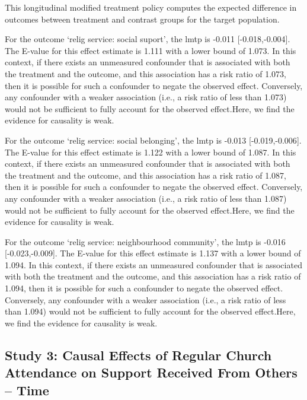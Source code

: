 \documentclass[
  singlecolumn]{article}
\begin{document}
This longitudinal modified treatment policy computes the expected
difference in outcomes between treatment and contrast groups for the
target population.

For the outcome `relig service: social suport', the lmtp is -0.011
{[}-0.018,-0.004{]}. The E-value for this effect estimate is 1.111 with
a lower bound of 1.073. In this context, if there exists an unmeasured
confounder that is associated with both the treatment and the outcome,
and this association has a risk ratio of 1.073, then it is possible for
such a confounder to negate the observed effect. Conversely, any
confounder with a weaker association (i.e., a risk ratio of less than
1.073) would not be sufficient to fully account for the observed
effect.Here, we find the evidence for causality is weak.

For the outcome `relig service: social belonging', the lmtp is -0.013
{[}-0.019,-0.006{]}. The E-value for this effect estimate is 1.122 with
a lower bound of 1.087. In this context, if there exists an unmeasured
confounder that is associated with both the treatment and the outcome,
and this association has a risk ratio of 1.087, then it is possible for
such a confounder to negate the observed effect. Conversely, any
confounder with a weaker association (i.e., a risk ratio of less than
1.087) would not be sufficient to fully account for the observed
effect.Here, we find the evidence for causality is weak.

For the outcome `relig service: neighbourhood community', the lmtp is
-0.016 {[}-0.023,-0.009{]}. The E-value for this effect estimate is
1.137 with a lower bound of 1.094. In this context, if there exists an
unmeasured confounder that is associated with both the treatment and the
outcome, and this association has a risk ratio of 1.094, then it is
possible for such a confounder to negate the observed effect.
Conversely, any confounder with a weaker association (i.e., a risk ratio
of less than 1.094) would not be sufficient to fully account for the
observed effect.Here, we find the evidence for causality is weak.

\newpage{}

\subsection{Study 3: Causal Effects of Regular Church Attendance on
Support Received From Others --
Time}\label{study-3-causal-effects-of-regular-church-attendance-on-support-received-from-others-time}
\end{document}

